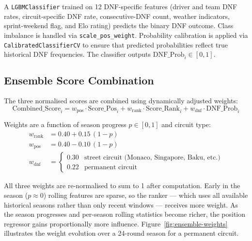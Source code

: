 \documentclass[12pt, a4paper, oneside]{report}
\begin{document}
A \texttt{LGBMClassifier} trained on 12 DNF-specific features (driver and team
DNF rates, circuit-specific DNF rate, consecutive-DNF count, weather indicators,
sprint-weekend flag, and Elo rating) predicts the binary DNF outcome. Class
imbalance is handled via \texttt{scale\_pos\_weight}. Probability calibration is
applied via \texttt{CalibratedClassifierCV} to ensure that predicted
probabilities reflect true historical DNF frequencies. The classifier outputs
$\text{DNF\_Prob}_i \in [0,1]$.

\subsection{Ensemble Score Combination}
\label{subsec:ensemble}

The three normalised scores are combined using dynamically adjusted weights:
\[
\text{Combined\_Score}_i =
  w_{\text{pos}} \cdot \text{Score\_Pos}_i
  + w_{\text{rank}} \cdot \text{Score\_Rank}_i
  + w_{\text{dnf}} \cdot \text{DNF\_Prob}_i
\]

Weights are a function of season progress $p \in [0,1]$ and circuit type:
\begin{align*}
  w_{\text{rank}} &= 0.40 + 0.15\,(1-p) \\
  w_{\text{pos}}  &= 0.40 - 0.10\,(1-p) \\
  w_{\text{dnf}}  &=
    \begin{cases}
      0.30 & \text{street circuit (Monaco, Singapore, Baku, etc.)} \\
      0.22 & \text{permanent circuit}
    \end{cases}
\end{align*}

All three weights are re-normalised to sum to 1 after computation. Early in
the season ($p \approx 0$) rolling features are sparse, so the ranker --- which
uses all available historical seasons rather than only recent windows --- receives
more weight. As the season progresses and per-season rolling statistics become
richer, the position regressor gains proportionally more influence.
Figure~\ref{fig:ensemble-weights} illustrates the weight evolution over a 24-round
season for a permanent circuit.
\end{document}
